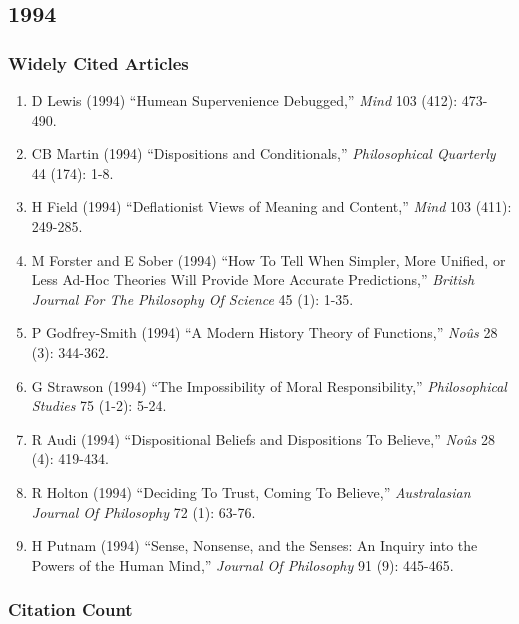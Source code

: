 \documentclass[
  10pt,
  letterpaper,
  DIV=11,
  numbers=noendperiod,
  twoside]{scrartcl}
\providecommand{\tightlist}{%
  \setlength{\itemsep}{0pt}\setlength{\parskip}{0pt}}\usepackage{longtable,booktabs,array}
\begin{document}
\newpage

\subsection{1994}\label{sec-s1994}

\subsubsection*{Widely Cited Articles}\label{widely-cited-articles-38}

\begin{enumerate}
\def\labelenumi{\arabic{enumi}.}
\tightlist
\item
  D Lewis (1994) ``Humean Supervenience Debugged,'' \emph{Mind} 103
  (412): 473-490.
\item
  CB Martin (1994) ``Dispositions and Conditionals,''
  \emph{Philosophical Quarterly} 44 (174): 1-8.
\item
  H Field (1994) ``Deflationist Views of Meaning and Content,''
  \emph{Mind} 103 (411): 249-285.
\item
  M Forster and E Sober (1994) ``How To Tell When Simpler, More Unified,
  or Less Ad-Hoc Theories Will Provide More Accurate Predictions,''
  \emph{British Journal For The Philosophy Of Science} 45 (1): 1-35.
\item
  P Godfrey-Smith (1994) ``A Modern History Theory of Functions,''
  \emph{Noûs} 28 (3): 344-362.
\item
  G Strawson (1994) ``The Impossibility of Moral Responsibility,''
  \emph{Philosophical Studies} 75 (1-2): 5-24.
\item
  R Audi (1994) ``Dispositional Beliefs and Dispositions To Believe,''
  \emph{Noûs} 28 (4): 419-434.
\item
  R Holton (1994) ``Deciding To Trust, Coming To Believe,''
  \emph{Australasian Journal Of Philosophy} 72 (1): 63-76.
\item
  H Putnam (1994) ``Sense, Nonsense, and the Senses: An Inquiry into the
  Powers of the Human Mind,'' \emph{Journal Of Philosophy} 91 (9):
  445-465.
\end{enumerate}

\subsubsection*{Citation Count}\label{sec-count-1994}
\end{document}
